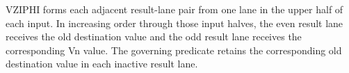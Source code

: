 VZIPHI forms each adjacent result-lane pair from one lane in the upper half of
each input.  In increasing order through those input halves, the even result
lane receives the old destination value and the odd result lane receives the
corresponding Vn value.  The governing predicate retains the corresponding old
destination value in each inactive result lane.
